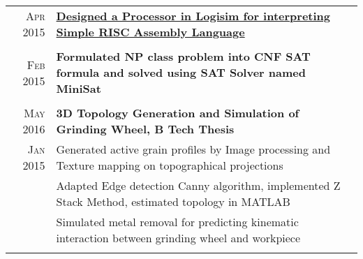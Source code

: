 \documentclass[a4paper,10pt]{article}
\begin{document}
\begin{longtable}{r|p{16cm}}
\textsc{Apr 2015} & \textbf{\href{https://github.com/kautsiitd/Simple-RISC-Interpretor-in-Logisim}{Designed a Processor in Logisim for interpreting Simple RISC Assembly Language}} \\\multicolumn{2}{c}{}\\

\textsc{Feb 2015} & \textbf{Formulated NP class problem into CNF SAT formula and solved using SAT Solver named MiniSat} \\\multicolumn{2}{c}{}\\

\textsc{May 2016} & \textbf{3D Topology Generation and Simulation of Grinding Wheel, B Tech Thesis} \\
\textsc{Jan 2015} & Generated active grain profiles by Image processing and Texture mapping on topographical projections\\
& Adapted Edge detection Canny algorithm, implemented Z Stack Method, estimated topology in MATLAB\\
& Simulated metal removal for predicting kinematic interaction between grinding wheel and workpiece\\\multicolumn{2}{c}{}\\

\end{longtable}

\end{document}
